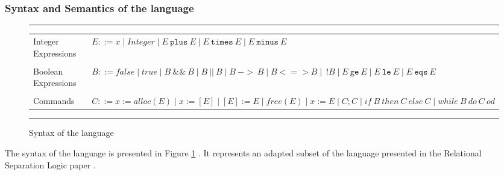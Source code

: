 \documentclass[12pt,a4paper]{article}
\begin{document}
\subsubsection{Syntax and Semantics of the language}
\begin{figure}[h]
	\noindent\rule{\linewidth}{0.4pt}
	\begin{tabularx}{\linewidth}{l  X}
		Integer Expressions& \(E ::= x \mid Integer \mid E\ \mathtt{plus}\ E \mid E\ \mathtt{times}\ E \mid E\ \mathtt{minus}\ E \) \\
		\\
		Boolean Expressions& \(B ::= false \mid true \mid B\ \mathtt{\&\&}\ B \mid  B\ ||\ B \mid B\  \mathtt{->}\ B \mid B \mathtt{<=>} B \mid \ ! B \mid E\ \mathtt{ge}\ E \mid E\ \mathtt{le}\ E \mid E\ \mathtt{eqs}\ E \)\\
		\\ 	
		Commands& \(C ::= x := alloc(E) \mid x := [E] \mid [E] := E \mid free(E) \mid x := E \mid C;C \mid if\ B\ then\ C\ else\ C \mid while\ B\ do\ C\ od \) \\
	\end{tabularx}
	\caption{Syntax of the language}
	\label{fig:langSyntax}
	\noindent\rule{\linewidth}{0.4pt}
\end{figure}
The syntax of the language is presented in Figure \ref{fig:langSyntax} . It represents an adapted subset of the language presented in the Relational Separation Logic paper \cite{relational} . 
\end{document}

